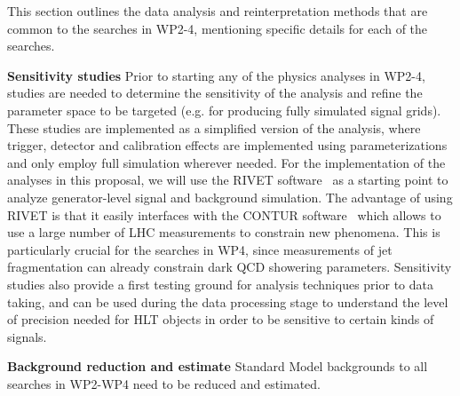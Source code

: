 This section outlines the data analysis and reinterpretation methods that are common to the searches in WP2-4, mentioning specific details for each of the searches. 

\textbf{Sensitivity studies} Prior to starting any of the physics analyses in WP2-4, studies are needed to determine the sensitivity of the analysis and refine the parameter space to be targeted (e.g. for producing fully simulated signal grids). 
These studies are implemented as a simplified version of the analysis, where trigger, detector and calibration effects are implemented using parameterizations and only employ full simulation wherever needed. 
For the implementation of the analyses in this proposal, we will use the RIVET software~\cite{ToBeCited}%
as a starting point to analyze generator-level signal and background simulation. 
The advantage of using RIVET is that it easily interfaces with the CONTUR software~\cite{ToBeCited}%
which allows to use a large number of LHC measurements to constrain new phenomena. 
This is particularly crucial for the searches in WP4, since measurements of jet fragmentation can already constrain dark QCD showering parameters. 
Sensitivity studies also provide a first testing ground for analysis techniques prior to data taking, and can be used during the data processing stage 
to understand the level of precision needed for HLT objects in order to be sensitive to certain kinds of signals. 

\textbf{Background reduction and estimate}
Standard Model backgrounds to all searches in WP2-WP4 need to be reduced and estimated. 

